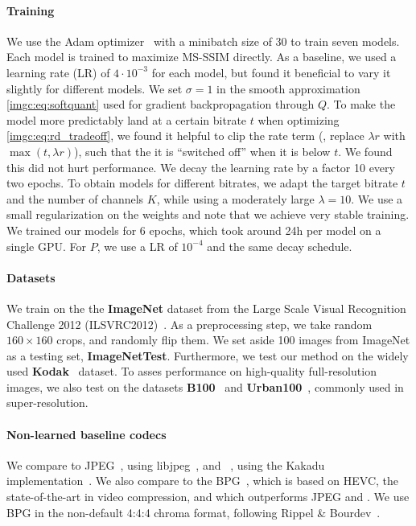 \paragraph{Training} We use the Adam optimizer~\cite{kingma2014adam} with a minibatch size of 30 to train seven models. Each model is trained to maximize MS-SSIM directly. As a baseline, we used a learning rate (LR) of $4 \cdot 10^{-3}$ for each model, but found it beneficial to vary it slightly for different models. We set $\sigma=1$ in the smooth approximation \eqref{imgc:eq:softquant} used for gradient backpropagation through $Q$. 
To make the model more predictably land at a certain bitrate $t$ when optimizing \eqref{imgc:eq:rd_tradeoff}, we found it helpful to clip the rate term (\ie, replace $\lambda r$ with $\max(t,\lambda r)$), such that the it is ``switched off'' when it is below $t$. We found this did not hurt performance.
We decay the learning rate by a factor 10 every two epochs. To obtain models for different bitrates, we adapt the target bitrate $t$ and the number of channels $K$, while using a moderately large $\lambda=10$. We use a small regularization on the weights and note that we achieve very stable training. We trained our models for 6 epochs, which took around 24h per model on a single GPU.
For $P$, we use a LR of $10^{-4}$ and the same decay schedule.


\paragraph{Datasets} We train on the the \textbf{ImageNet} dataset from the Large Scale Visual Recognition Challenge 2012 (ILSVRC2012)~\cite{ImageNet_ILSVRC15}. As a preprocessing step, we take random $160 \times 160$ crops, and randomly flip them. We set aside 100 images from ImageNet as a testing set, \mbox{\textbf{ImageNetTest}}. Furthermore, we test our method on the widely used \textbf{Kodak}~\cite{kodakurl} dataset. To asses performance on high-quality full-resolution images, we also test on the datasets \textbf{B100}~\cite{Timofte2014} and \textbf{Urban100}~\cite{Huang-CVPR-2015}, commonly used in super-resolution.
\paragraph{Non-learned baseline codecs} We compare to JPEG~\cite{jpeg1992wallace}, using libjpeg~\cite{libjpegurl}, and \jpegk~\cite{jpeg2000taubman}, using the Kakadu implementation~\cite{kakaduurl}. We also compare to the BPG~\cite{bpg}, which is based on HEVC, the state-of-the-art in video compression, and which outperforms JPEG and \jpegk. We use BPG in the non-default 4:4:4 chroma format, following Rippel \& Bourdev~\cite{rippel17a}.

